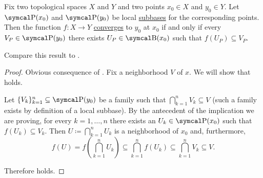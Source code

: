 \begin{proposition}\label{thm:cauchy_function_convergence_via_subbases}
  Fix two topological spaces \( X \) and \( Y \) and two points \( x_0 \in X \) and \( y_0 \in Y \). Let \( \CP(x_0) \) and \( \CP(y_0) \) be local \hyperref[def:topological_local_subbase]{subbases} for the corresponding points. Then the function \( f: X \to Y \) \hyperref[def:local_convergence]{converges} to \( y_0 \) at \( x_0 \) if and only if every \( V_P \in \CP(y_0) \) there exists \( U_P \in \CB(x_0) \) such that \( f(U_P) \subseteq V_P \).

  Compare this result to .
\end{proposition}
\begin{proof}
  \Sufficiency Obvious consequence of .
  \Necessity Fix a neighborhood \( V \) of \( x \). We will show that  holds.

  Let \( \{ V_k \}_{k=1}^n \subseteq \CP(y_0) \) be a family such that \( \bigcap_{k=1}^n V_k \subseteq V \) (such a family exists by definition of a local subbase). By the antecedent of the implication we are proving, for every \( k = 1, \ldots, n \) there exists an \( U_k \in \CP(x_0) \) such that \( f(U_k) \subseteq V_k \). Then \( U \coloneqq \bigcap_{k=1}^n U_k \) is a neighborhood of \( x_0 \) and, furthermore,
  \begin{equation*}
    f(U)
    =
    f\left(\bigcap_{k=1}^n U_k \right)
    \subseteq
    \bigcap_{k=1}^n f(U_k)
    \subseteq
    \bigcap_{k=1}^n V_k
    \subseteq
    V.
  \end{equation*}

  Therefore  holds.
\end{proof}
